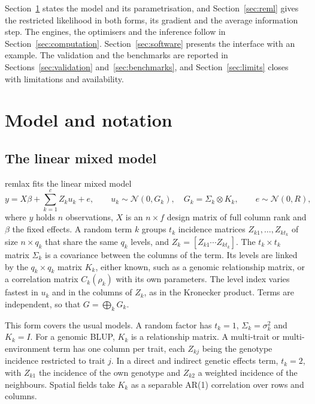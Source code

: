 \documentclass[article,nojss]{jss}
\renewcommand{\pkg}[1]{#1}
\begin{document}
Section~\ref{sec:model} states the model and its parametrisation, and
Section~\ref{sec:reml} gives the restricted likelihood in both forms, its
gradient and the average information step. The engines, the optimisers and
the inference follow in Section~\ref{sec:computation}.
Section~\ref{sec:software} presents the  interface with an
example. The validation and the benchmarks are reported in
Sections~\ref{sec:validation} and~\ref{sec:benchmarks}, and
Section~\ref{sec:limits} closes with limitations and availability.

\section{Model and notation}\label{sec:model}

\subsection{The linear mixed model}

\pkg{remlax} fits the linear mixed model
\begin{equation}\label{eq:lmm}
  y = X\beta + \sum_{k=1}^{c} Z_k u_k + e,
  \qquad
  u_k \sim \mathcal{N}(0, G_k), \quad G_k = \Sigma_k \otimes K_k,
  \qquad
  e \sim \mathcal{N}(0, R),
\end{equation}
where $y$ holds $n$ observations, $X$ is an $n \times f$ design matrix of full
column rank and $\beta$ the fixed effects. A random term $k$ groups $t_k$
incidence matrices $Z_{k1}, \dots, Z_{kt_k}$ of size $n \times q_k$ that share
the same $q_k$ levels, and $Z_k = [Z_{k1} \cdots Z_{kt_k}]$. The $t_k \times
t_k$ matrix $\Sigma_k$ is a covariance between the columns of the term. Its
levels are linked by the $q_k \times q_k$ matrix $K_k$, either known, such as a
genomic relationship matrix, or a correlation matrix $C_k(\rho_k)$ with its
own parameters. The level index varies fastest in $u_k$ and in the columns of
$Z_k$, as in the Kronecker product. Terms are independent,
so that $G = \bigoplus_k G_k$.

This form covers the usual models. A random factor has $t_k = 1$, $\Sigma_k =
\sigma_k^2$ and $K_k = I$. For a genomic BLUP, $K_k$ is a relationship
matrix. A multi-trait or multi-environment term has one column per trait, each
$Z_{kj}$ being the genotype incidence restricted to trait $j$. In a direct and
indirect genetic effects term, $t_k = 2$, with $Z_{k1}$ the incidence of the
own genotype and $Z_{k2}$ a weighted incidence of the neighbours. Spatial
fields take $K_k$ as a separable AR(1) correlation over rows and columns.
\end{document}

